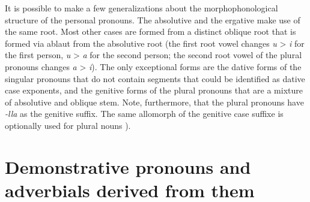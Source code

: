 It is possible to make a few generalizations about the morphophonological structure of the personal pronouns. The absolutive and the ergative make use of the same root. Most other cases are formed from a distinct oblique root that is formed via ablaut from the absolutive root (the first root vowel changes \textit{u} > \textit{i} for the first person, \textit{u} > \textit{a} for the second person; the second root vowel of the plural pronouns changes \textit{a} > \textit{i}). The only exceptional forms are the dative forms of the singular pronouns that do not contain segments that could be identified as dative case exponents, and the genitive forms of the plural pronouns that are a mixture of absolutive and oblique stem. Note, furthermore, that the plural pronouns have \textit{-lla} as the genitive suffix. The same allomorph of the genitive case suffixe is optionally used for plural nouns ).



\section{Demonstrative pronouns and adverbials derived from them}
\label{sec:Demonstrative pronouns}

